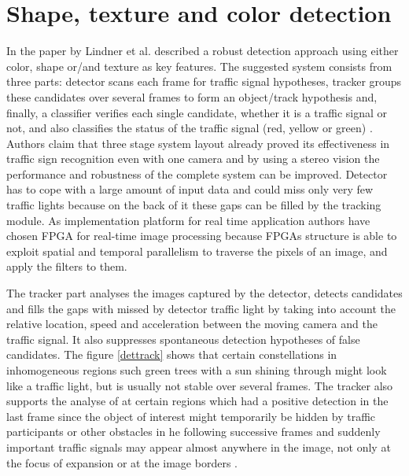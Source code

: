 \documentclass[letterpaper, 10 pt, conference]{ieeeconf} %
\begin{document}

\section{Shape, texture and color detection}
 
In the paper by Lindner et al. described a robust detection approach using either color, shape or/and texture as key features. The suggested system consists from three parts: detector scans each frame for traffic signal hypotheses, tracker groups these candidates over several frames to form an object/track hypothesis and, finally, a classifier verifies each single candidate, whether it is a traffic signal or not, and also classifies the status of the traffic signal (red, yellow or green) \cite{c6}. Authors claim that three stage system layout already proved its effectiveness in traffic sign recognition even with one camera and by using a stereo vision the performance and robustness of the complete system can be improved. Detector has to cope with a large amount of input data and could miss only very few traffic lights because on the back of it these gaps can be filled by the tracking module. As implementation platform for real time application authors have chosen FPGA for real-time image processing because FPGAs structure is able to exploit spatial and temporal parallelism to traverse the pixels of an image, and apply the filters to them.

The tracker part analyses the images captured by the detector, detects candidates and fills the gaps with missed by detector traffic light by taking into account the relative location, speed and acceleration between the moving camera and the traffic signal. It also suppresses spontaneous detection hypotheses of false candidates. The figure \ref{dettrack} shows that certain constellations in inhomogeneous regions such green trees with a sun shining through might look like a traffic light, but is usually not stable over several frames. The tracker also supports the analyse of at certain regions which had a positive detection in the last frame since the object of interest might temporarily be hidden by traffic participants or other obstacles in he following successive frames and suddenly important traffic signals may appear almost anywhere in the image, not only at the focus of expansion or at the image borders \cite{c6}.
\end{document}
